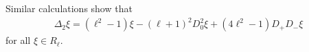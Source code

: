 
Similar calculations show that
\begin{align*}
  \Delta_2 \xi = (\ell^2-1)\xi - (\ell+1)^2D_0^2 \xi + (4\ell^2-1)D_+D_-\xi
\end{align*}
for all $\xi \in R_\ell$.


